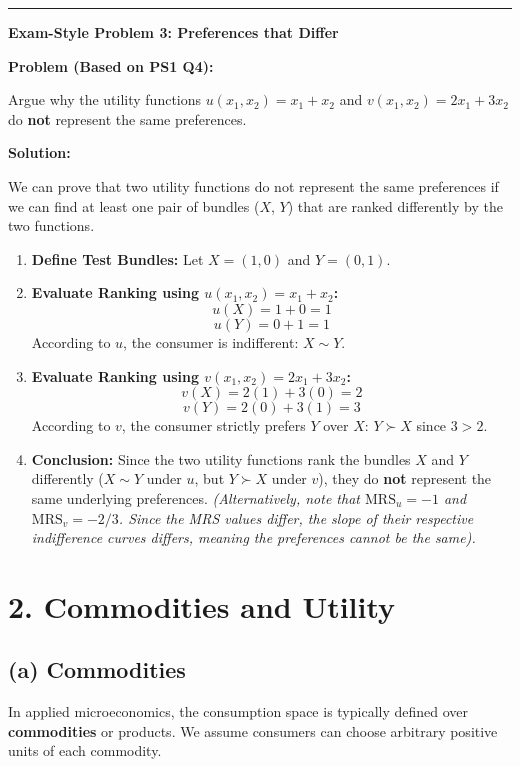 \documentclass{article}
\begin{document}
\noindent\rule{\linewidth}{0.4pt}

\noindent\textbf{Exam-Style Problem 3: Preferences that Differ}

\textbf{Problem (Based on PS1 Q4):}

Argue why the utility functions $u(x_1, x_2) = x_1 + x_2$ and $v(x_1, x_2) = 2x_1 + 3x_2$ do \textbf{not} represent the same preferences.

\textbf{Solution:}

We can prove that two utility functions do not represent the same preferences if we can find at least one pair of bundles ($X$, $Y$) that are ranked differently by the two functions.

\begin{enumerate}
    \item \textbf{Define Test Bundles:} Let $X = (1, 0)$ and $Y = (0, 1)$.
    \item \textbf{Evaluate Ranking using $u(x_1, x_2) = x_1 + x_2$:} \[u(X) = 1 + 0 = 1\] \[u(Y) = 0 + 1 = 1\] According to $u$, the consumer is indifferent: $X \sim Y$.
    \item \textbf{Evaluate Ranking using $v(x_1, x_2) = 2x_1 + 3x_2$:} \[v(X) = 2(1) + 3(0) = 2\] \[v(Y) = 2(0) + 3(1) = 3\] According to $v$, the consumer strictly prefers $Y$ over $X$: $Y \succ X$ since $3 > 2$.
    \item \textbf{Conclusion:} Since the two utility functions rank the bundles $X$ and $Y$ differently ($X \sim Y$ under $u$, but $Y \succ X$ under $v$), they do \textbf{not} represent the same underlying preferences. \textit{(Alternatively, note that $\text{MRS}_u = -1$ and $\text{MRS}_v = -2/3$. Since the MRS values differ, the slope of their respective indifference curves differs, meaning the preferences cannot be the same).}
\end{enumerate}

\hrulefill

\section{2. Commodities and Utility}
\subsection{(a) Commodities}

In applied microeconomics, the consumption space is typically defined over \textbf{commodities} or products. We assume consumers can choose arbitrary positive units of each commodity.
\end{document}
